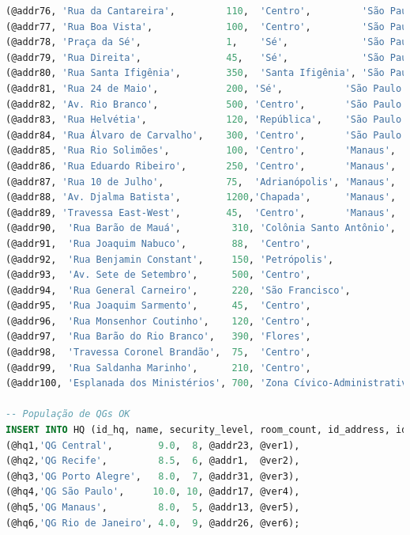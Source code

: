 \documentclass[12pt,a4paper]{report}
\begin{document}
\begin{lstlisting}[language=SQL, caption=population.sql]
(@addr76, 'Rua da Cantareira',         110,  'Centro',         'São Paulo', 'SP', '01103-200'),
(@addr77, 'Rua Boa Vista',             100,  'Centro',         'São Paulo', 'SP', '01014-001'),
(@addr78, 'Praça da Sé',               1,    'Sé',             'São Paulo', 'SP', '01001-000'),
(@addr79, 'Rua Direita',               45,   'Sé',             'São Paulo', 'SP', '01002-000'),
(@addr80, 'Rua Santa Ifigênia',        350,  'Santa Ifigênia', 'São Paulo', 'SP', '01207-010'),
(@addr81, 'Rua 24 de Maio',            200, 'Sé',           'São Paulo', 'SP', '01041-001'),
(@addr82, 'Av. Rio Branco',            500, 'Centro',       'São Paulo', 'SP', '01205-000'),
(@addr83, 'Rua Helvétia',              120, 'República',    'São Paulo', 'SP', '01225-020'),
(@addr84, 'Rua Álvaro de Carvalho',    300, 'Centro',       'São Paulo', 'SP', '01050-070'),
(@addr85, 'Rua Rio Solimões',          100, 'Centro',       'Manaus',    'AM', '69010-080'),
(@addr86, 'Rua Eduardo Ribeiro',       250, 'Centro',       'Manaus',    'AM', '69010-001'),
(@addr87, 'Rua 10 de Julho',           75,  'Adrianópolis', 'Manaus',    'AM', '69057-010'),
(@addr88, 'Av. Djalma Batista',        1200,'Chapada',      'Manaus',    'AM', '69050-010'),
(@addr89, 'Travessa East-West',        45,  'Centro',       'Manaus',    'AM', '69010-270'),
(@addr90,  'Rua Barão de Mauá',         310, 'Colônia Santo Antônio', 'Manaus',    'AM', '69093-040'),
(@addr91,  'Rua Joaquim Nabuco',        88,  'Centro',                'Manaus',    'AM', '69005-080'),
(@addr92,  'Rua Benjamin Constant',     150, 'Petrópolis',            'Manaus',    'AM', '69063-010'),
(@addr93,  'Av. Sete de Setembro',      500, 'Centro',                'Manaus',    'AM', '69005-140'),
(@addr94,  'Rua General Carneiro',      220, 'São Francisco',         'Manaus',    'AM', '69079-020'),
(@addr95,  'Rua Joaquim Sarmento',      45,  'Centro',                'Manaus',    'AM', '69010-020'),
(@addr96,  'Rua Monsenhor Coutinho',    120, 'Centro',                'Manaus',    'AM', '69010-110'),
(@addr97,  'Rua Barão do Rio Branco',   390, 'Flores',                'Manaus',    'AM', '69058-581'),
(@addr98,  'Travessa Coronel Brandão',  75,  'Centro',                'Manaus',    'AM', '69010-060'),
(@addr99,  'Rua Saldanha Marinho',      210, 'Centro',                'Manaus',    'AM', '69010-040'),
(@addr100, 'Esplanada dos Ministérios', 700, 'Zona Cívico-Administrativa', 'Brasília', 'DF', '70040-906');

-- População de QGs OK
INSERT INTO HQ (id_hq, name, security_level, room_count, id_address, id_verissimo) VALUES
(@hq1,'QG Central',        9.0,  8, @addr23, @ver1),
(@hq2,'QG Recife',         8.5,  6, @addr1,  @ver2),
(@hq3,'QG Porto Alegre',   8.0,  7, @addr31, @ver3),
(@hq4,'QG São Paulo',     10.0, 10, @addr17, @ver4),
(@hq5,'QG Manaus',         8.0,  5, @addr13, @ver5),
(@hq6,'QG Rio de Janeiro', 4.0,  9, @addr26, @ver6);


\end{lstlisting}
\end{document}
